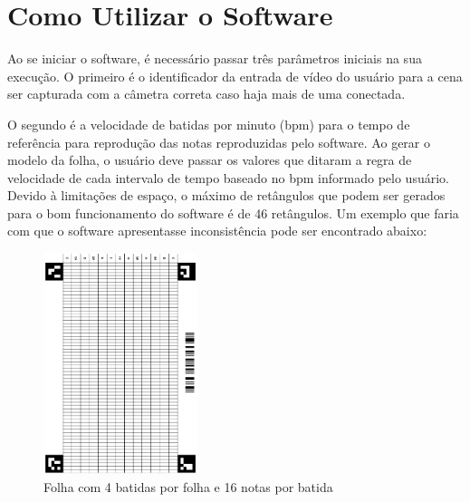 \documentclass[12pt]{report}
\begin{document}
{%

\chapter{Como Utilizar o Software}
\label{cha:cha6}

Ao se iniciar o software, é necessário passar três parâmetros iniciais na sua execução. O primeiro é o identificador da entrada de vídeo do usuário para a cena ser capturada com a câmetra correta caso haja mais de uma conectada.

O segundo é a velocidade de batidas por minuto (bpm) para o tempo de referência para reprodução das notas reproduzidas pelo software. Ao gerar o modelo da folha, o usuário deve passar os valores que ditaram a regra de velocidade de cada intervalo de tempo baseado no bpm informado pelo usuário. Devido à limitações de espaço, o máximo de retângulos que podem ser gerados para o bom funcionamento do software é de 46 retângulos. Um exemplo que faria com que o software apresentasse inconsistência pode ser encontrado abaixo:

\begin{figure}[H]
  \centering
    \includegraphics[angle=90,origin=c,width=0.4\textwidth]{imagens/416.png}
    \caption{Folha com 4 batidas por folha e 16 notas por batida}
  \label{fig:416}
\end{figure}

}
\end{document}
